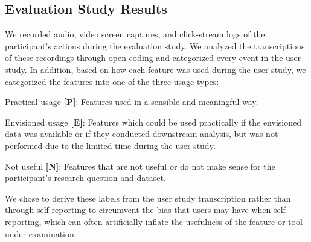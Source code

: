 \subsection{Evaluation Study Results\label{eval_findings}}
We recorded audio, video screen captures, and click-stream logs of the participant's actions during the evaluation study. We analyzed the transcriptions of these recordings through open-coding and categorized every event in the user study. In addition, based on how each feature was used during the user study, we categorized the features into one of the three usage types:
\begin{denselist}
    \item Practical usage \textbf{[P]}: Features used in a sensible and meaningful way.
    \item Envisioned usage \textbf{[E]}: Features which could be used practically if the envisioned data was available or if they conducted downstream analysis, but was not performed due to the limited time during the user study.
    \item Not useful \textbf{[N]}: Features that are not useful or do not make sense for the participant's research question and dataset.
\end{denselist}
We chose to derive these labels from the user study transcription rather than through self-reporting to circumvent the bias that users may have when self-reporting, which can often artificially inflate the usefulness of the feature or tool under examination.
